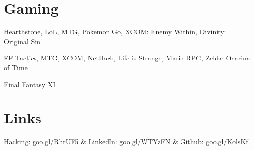 \documentclass[margin,line]{resume}
\begin{document}
\begin{resume}

\section{Gaming}
\begin{description}[topsep=0pt,partopsep=0pt,itemsep=0pt,leftmargin=!,labelwidth=\widthof{\bfseries Most Play}]
    \small\item[Active    ] Hearthstone, LoL, MTG, Pokemon Go, XCOM: Enemy Within, Divinity: Original Sin
    \small\item[Favorite  ] FF Tactics, MTG, XCOM, NetHack, Life is Strange, Mario RPG, Zelda: Ocarina of Time
    \small\item[Most Play ] Final Fantasy XI
\end{description}


\section{Links}
\begin{ncolumn}{3}
   \setlength\parsep{15pt}
   \small Hacking: goo.gl/RhrUF5 & \small LinkedIn: goo.gl/WTYzFN & \small Github: goo.gl/KolsKf
\end{ncolumn}

\end{resume}
\end{document}
